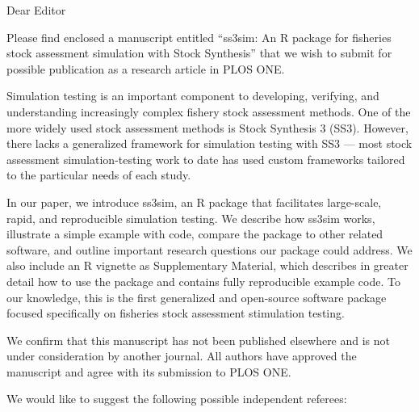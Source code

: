 \documentclass[letterpaper,11pt]{letter}
\begin{document}
\begin{letter}{}
\pagestyle{empty}
\opening{Dear Editor}


Please find enclosed a manuscript entitled ``ss3sim: An R package for fisheries
stock assessment simulation with Stock Synthesis'' that we wish to submit for
possible publication as a research article in PLOS ONE.

Simulation testing is an important component to developing, verifying, and
understanding increasingly complex fishery stock assessment methods. One of the
more widely used stock assessment methods is Stock Synthesis 3 (SS3). However,
there lacks a generalized framework for simulation testing with SS3 --- most
stock assessment simulation-testing work to date has used custom frameworks
tailored to the particular needs of each study.

In our paper, we introduce ss3sim, an R package that facilitates large-scale,
rapid, and reproducible simulation testing. We describe how ss3sim works,
illustrate a simple example with code, compare the package to other related
software, and outline important research questions our package could address.
We also include an R vignette as Supplementary Material, which describes in
greater detail how to use the package and contains fully reproducible example
code. To our knowledge, this is the first generalized and open-source software
package focused specifically on fisheries stock assessment stimulation testing.

We confirm that this manuscript has not been published elsewhere and is not
under consideration by another journal. All authors have approved the
manuscript and agree with its submission to PLOS ONE.

We would like to suggest the following possible independent referees:


\end{letter}
\end{document}

